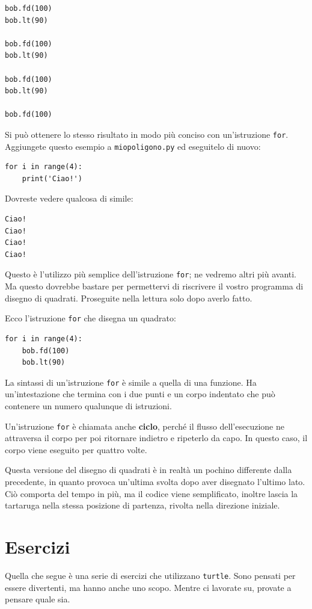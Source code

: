 \documentclass[10pt]{book}
\begin{document}
\begin{verbatim}
bob.fd(100)
bob.lt(90)

bob.fd(100)
bob.lt(90)

bob.fd(100)
bob.lt(90)

bob.fd(100)
\end{verbatim}
%
Si può ottenere lo stesso risultato in modo più conciso con un'istruzione {\tt for}. Aggiungete questo esempio a {\tt miopoligono.py} ed eseguitelo di nuovo:

\begin{verbatim}
for i in range(4):
    print('Ciao!')
\end{verbatim}
%
Dovreste vedere qualcosa di simile:

\begin{verbatim}
Ciao!
Ciao!
Ciao!
Ciao!
\end{verbatim}
%
Questo è l'utilizzo più semplice dell'istruzione {\tt for}; ne vedremo altri più avanti. Ma questo dovrebbe bastare per permettervi di riscrivere il vostro programma di disegno di quadrati. Proseguite nella lettura solo dopo averlo fatto.

Ecco l'istruzione {\tt for} che disegna un quadrato:

\begin{verbatim}
for i in range(4):
    bob.fd(100)
    bob.lt(90)
\end{verbatim}
%
La sintassi di un'istruzione {\tt for} è simile a quella di una funzione. Ha un'intestazione che termina con i due punti e un corpo indentato che può contenere un numero qualunque di istruzioni.

Un'istruzione {\tt for} è chiamata anche {\bf ciclo}, perché il flusso dell'esecuzione ne attraversa il corpo per poi ritornare indietro e ripeterlo da capo. In questo caso, il corpo viene eseguito per quattro volte.

Questa versione del disegno di quadrati è in realtà un pochino differente dalla precedente, in quanto provoca un'ultima svolta dopo aver disegnato l'ultimo lato. Ciò comporta del tempo in più, ma il codice viene semplificato, inoltre lascia la tartaruga nella stessa posizione di partenza, rivolta nella direzione iniziale.

\section{Esercizi}

Quella che segue è una serie di esercizi che utilizzano {\tt turtle}. Sono pensati per essere divertenti, ma hanno anche uno scopo. Mentre ci lavorate su, provate a pensare quale sia.
\end{document}
